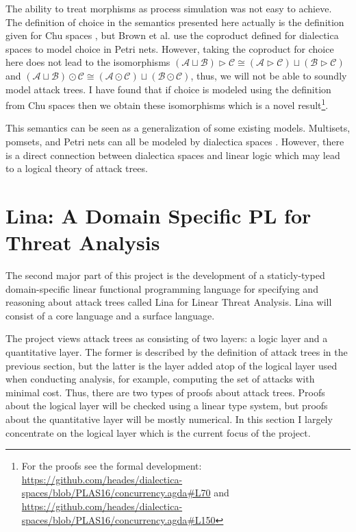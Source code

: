 \documentclass{sigplanconf}
\newcommand{\cat}[1]{\mathcal{#1}}
\begin{document}
The ability to treat morphisms as process simulation was not easy to
achieve.  The definition of choice in the semantics presented here
actually is the definition given for Chu spaces \cite{Gupta:1994}, but
Brown et al. use the coproduct defined for dialectica spaces to model
choice in Petri nets.  However, taking the coproduct for choice here
does not lead to the isomorphisms $(\cat{A} \sqcup \cat{B}) \rhd
\cat{C} \cong (\cat{A} \rhd \cat{C}) \sqcup (\cat{B} \rhd \cat{C})$
and $(\cat{A} \sqcup \cat{B}) \odot \cat{C} \cong (\cat{A} \odot
\cat{C}) \sqcup (\cat{B} \odot \cat{C})$, thus, we will not be able to
soundly model attack trees.  I have found that if choice is modeled
using the definition from Chu spaces \cite{Gupta:1994} then we obtain
these isomorphisms which is a novel result\footnote{For the proofs see
  the formal development:
  \url{https://github.com/heades/dialectica-spaces/blob/PLAS16/concurrency.agda\#L70}
  and
  \url{https://github.com/heades/dialectica-spaces/blob/PLAS16/concurrency.agda\#L150}}.

This semantics can be seen as a generalization of some existing
models.  Multisets, pomsets, and Petri nets can all be modeled by
dialectica spaces \cite{Brown:1991,Gupta:1994}.  However, there is a
direct connection between dialectica spaces and linear logic which
may lead to a logical theory of attack trees.

\section{Lina: A Domain Specific PL for Threat Analysis}
\label{sec:lina:_a_domain_specific_pl_for_threat_analysis}

The second major part of this project is the development of a
staticly-typed domain-specific linear functional programming language
for specifying and reasoning about attack trees called Lina for Linear
Threat Analysis.  Lina will consist of a core language and a surface
language.

The project views attack trees as consisting of two layers: a logic
layer and a quantitative layer.  The former is described by the
definition of attack trees in the previous section, but the latter is
the layer added atop of the logical layer used when conducting
analysis, for example, computing the set of attacks with minimal cost.
Thus, there are two types of proofs about attack trees.  Proofs about
the logical layer will be checked using a linear type system, but
proofs about the quantitative layer will be mostly numerical. In this
section I largely concentrate on the logical layer which is the
current focus of the project.
\end{document}
